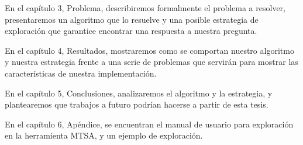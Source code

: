 \vspace{\baselineskip}
En el capítulo 3, Problema, describiremos formalmente el problema a resolver, presentaremos un algoritmo que lo resuelve 
y una posible estrategia de exploración que garantice encontrar una respuesta a nuestra pregunta.

\vspace{\baselineskip}
En el capítulo 4, Resultados, mostraremos como se comportan nuestro algoritmo y nuestra estrategia frente a una serie 
de problemas que servirán para mostrar las características de nuestra implementación.

\vspace{\baselineskip}
En el capítulo 5, Conclusiones, analizaremos el algoritmo y la estrategia, y plantearemos que trabajos a futuro podrían 
hacerse a partir de esta tesis. 

\vspace{\baselineskip}
En el capítulo 6, Apéndice, se encuentran el manual de usuario para exploración en la herramienta MTSA, y un ejemplo de exploración.

